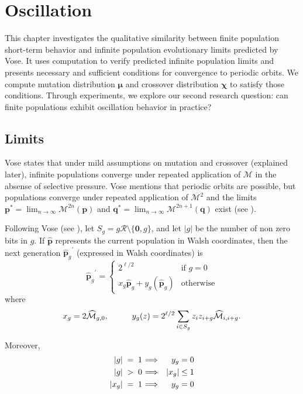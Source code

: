 \chapter{Oscillation} \label{ch:oscillation}
This chapter investigates the qualitative similarity between finite population 
short-term behavior and infinite population evolutionary limits predicted by Vose. 
It uses computation to verify predicted infinite population limits and presents 
necessary and sufficient conditions for convergence to periodic orbits. 
We compute mutation distribution $\bm{\mu}$ and crossover distribution $\bm{\chi}$ 
to satisfy those conditions. Through experiments, we explore our second research 
question: can finite populations exhibit oscillation behavior in practice?

\section{Limits}
\label{Limits}
Vose states that under mild assumptions on mutation and crossover (explained later), infinite populations converge under repeated application 
of $\mathcal{M}$ in the absense of selective pressure. Vose mentions that periodic orbits are possible, but populations converge under 
repeated application of $\mathcal{M}^2$ and the limits $\bm{p}^\ast = \lim_{n \rightarrow \infty} \mathcal{M}^{2n}({\bm p})$ 
and ${\bm q}^\ast = \lim_{n \rightarrow \infty} \mathcal{M}^{2n+1}({\bm q})$ exist (see \cite{Vose1999}).

Following Vose (see \cite{Vose1999}), let $S_g = g \mathcal{R} \setminus \{\textbf{0}, g\}$, and let $|g|$ be the number of non zero bits in $g$. 
If $\widehat{\bm{p}}$ represents the current population in Walsh coordinates, then the next generation ${\widehat{\bm{p}}_g}^{\prime}$ 
(expressed in Walsh coordinates) is 
\[
{{\widehat{\bm{p}}}_g}^{\prime}  = \begin{cases}
    2^{\ell /2}  & \text{if $g = 0$}\\
    x_g \widehat{{\bm p}}_g + y_g(\widehat{{\bm p}}_g) & \text{otherwise}
  \end{cases}
\]
where
\[
x_g = 2\widehat{\mathcal{M}}_{g,0},  \hspace*{1cm} y_g(z) = 2^{\ell /2} \sum_{i \in S_g} z_i z_{i+g} \widehat{\mathcal{M}}_{i,i+g}.
\]

Moreover, 
\begin{eqnarray*}
|g| \;=\; 1 \hspace{0.01in} & \Longrightarrow & y_g = 0 \\
|g| \;>\; 0 \hspace{0.01in} & \Longrightarrow & |x_g| \leq 1 \\
|x_g| \;=\; 1 \hspace{0.01in} & \Longrightarrow & y_g = 0
\end{eqnarray*}

